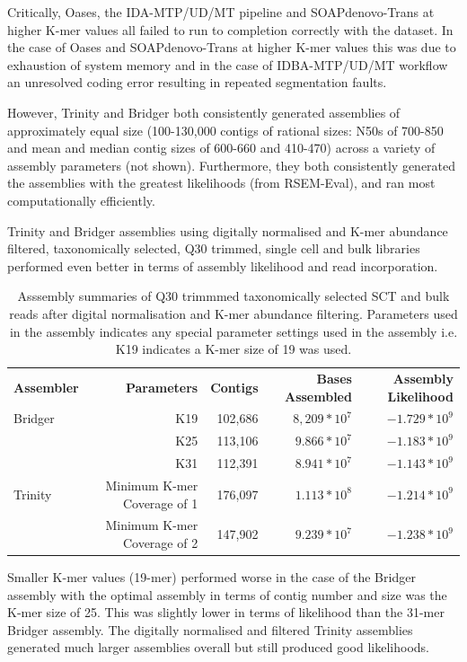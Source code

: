Critically, Oases, the IDA-MTP/UD/MT pipeline and SOAPdenovo-Trans at higher K-mer values
all failed to run to completion correctly with the dataset.  In the case of Oases
and SOAPdenovo-Trans at higher K-mer values this was due to exhaustion
of system memory and in the case of IDBA-MTP/UD/MT workflow an unresolved coding error 
resulting in repeated segmentation faults.

However, Trinity and Bridger both consistently generated assemblies of approximately
equal size (100-130,000 contigs of rational sizes: N50s of 700-850
    and mean and median contig sizes of 600-660 and 410-470) across a variety 
    of assembly parameters (not shown).  Furthermore, they both consistently
    generated the assemblies with the greatest likelihoods (from RSEM-Eval), 
    and ran most computationally efficiently. 


Trinity and Bridger assemblies using digitally normalised and K-mer abundance 
filtered, taxonomically selected, Q30 trimmed, single cell and bulk libraries performed 
even better in terms of assembly likelihood and read incorporation.

\begin{table}[h]
    \begin{tabular}{|l|r r r r}
        \textbf{Assembler} & \textbf{Parameters} & \textbf{Contigs} & \textbf{Bases Assembled} & \textbf{Assembly Likelihood} \\
        Bridger & K19 & 102,686 & \(8,209*10^{7}\)  & \(-1.729*10^{9}\) \\
                & K25 & 113,106 & \(9.866*10^{7}\)  & \(-1.183*10^{9} \) \\ 
                & K31 & 112,391 & \(8.941*10^{7}\)  & \(-1.143*10^9\) \\ 
        Trinity & Minimum K-mer Coverage of 1 & 176,097 &  \(1.113*10^{8}\)& \(-1.214*10^{9}\) \\  
                & Minimum K-mer Coverage of 2 & 147,902 & \(9.239*10^{7}\) & \(-1.238*10^9\) \\  
    \end{tabular}
    \caption{Asssembly summaries of Q30 trimmmed taxonomically selected SCT and bulk reads 
    after digital normalisation and K-mer abundance filtering. Parameters used in the assembly
indicates any special parameter settings used in the assembly i.e. K19 indicates a K-mer size of 19 was used.
}
    \label{tab:digassemby}
\end{table}

Smaller K-mer values (19-mer) performed worse in the case of the Bridger assembly
with the optimal assembly in terms of contig number and size was the K-mer size 
of 25.  This was slightly lower in terms of likelihood than the 31-mer Bridger
assembly. The digitally normalised and filtered Trinity assemblies 
generated much larger assemblies overall but still produced good likelihoods.

